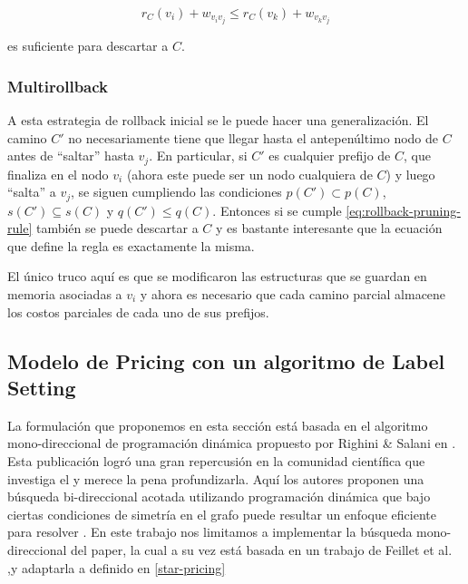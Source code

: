 \begin{equation}
\label{eq:rollback-pruning-rule}
    r_C(v_i) + w_{v_i v_j} \leq r_C(v_k) + w_{v_k v_j}
\end{equation}

es suficiente para descartar a $C$. 

\subsubsection{Multirollback}

A esta estrategia de rollback inicial se le puede hacer una generalización. El camino $C'$ no necesariamente tiene que llegar hasta el antepenúltimo nodo de $C$ antes de ``saltar'' hasta $v_j$. En particular, si $C'$ es cualquier prefijo de $C$, que finaliza en el nodo $v_i$ (ahora este puede ser un nodo cualquiera de $C$) y luego ``salta'' a $v_j$, se siguen cumpliendo las condiciones $p(C') \subset p(C)$, $s(C') \subseteq s(C)$ y $q(C') \leq q(C)$. Entonces si se cumple \ref{eq:rollback-pruning-rule} también se puede descartar a $C$ y es bastante interesante que la ecuación que define la regla es exactamente la misma. 

El único truco aquí es que se modificaron las estructuras que se guardan en memoria asociadas a $v_i$ y ahora es necesario que cada camino parcial almacene los costos parciales de cada uno de sus prefijos.


\subsection{Modelo de Pricing con un algoritmo de Label Setting}
\label{section:pricing-labeling}

La formulación que proponemos en esta sección está basada en el algoritmo mono-direccional de programación dinámica propuesto por Righini \& Salani en \cite{righini-salani}. Esta publicación logró una gran repercusión en la comunidad científica que investiga el  y merece la pena profundizarla.  Aquí los autores proponen una búsqueda bi-direccional acotada utilizando programación dinámica que bajo ciertas condiciones de simetría en el grafo puede resultar un enfoque eficiente para resolver . En este trabajo nos limitamos a implementar la búsqueda mono-direccional del paper, la cual a su vez está basada en un trabajo de Feillet et al. \cite{feillet-et-al},y adaptarla a  definido en \ref{star-pricing}


